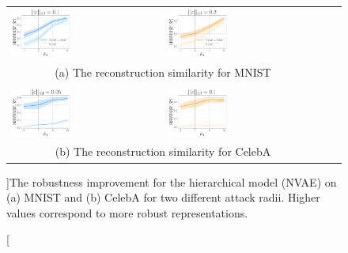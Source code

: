 {%
\begin{figure}[t]
    \begin{adjustbox}{center}
    \begin{tabular}{llll}
        \includegraphics[width=0.4\textwidth]{pics/3_adv_att/nvae_mnist_eps_1.pdf} & 
        \includegraphics[width=0.4\textwidth]{pics/3_adv_att/nvae_mnist_eps_2.pdf} \\
        \multicolumn{2}{c}{\normalsize (a) The reconstruction similarity for MNIST} \\ \\
        \includegraphics[width=0.4\textwidth]{pics/3_adv_att/nvae_celeba_eps_1.pdf} & 
        \includegraphics[width=0.4\textwidth]{pics/3_adv_att/nvae_celeba_eps_2.pdf}\\
         \multicolumn{2}{c}{\normalsize (b) The reconstruction similarity for CelebA}\\
    \end{tabular}
    \end{adjustbox}
    \caption[][\baselineskip]{The robustness improvement for the hierarchical model (NVAE) on (a) MNIST and (b) CelebA for two different attack radii. Higher values correspond to more robust representations.}
    \label{fig:nvae_res}
\end{figure}

}

